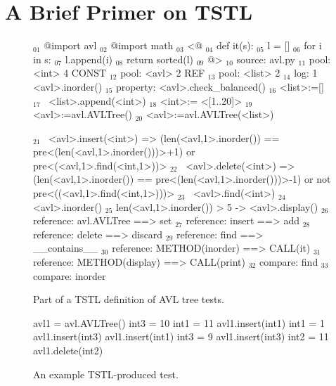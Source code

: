 \section{A Brief Primer on TSTL}

\begin{figure}
{\scriptsize
\begin{code}
$_{01}$ @import avl
$_{02}$ @import math
\vspace{0.1in}
$_{03}$ <@
$_{04}$ def it(s):
$_{05}$     l = []
$_{06}$     for i in s:
$_{07}$        l.append(i)
$_{08}$     return sorted(l)
$_{09}$ @>
\vspace{0.1in}
$_{10}$ source: avl.py
\vspace{0.1in}
$_{11}$ pool: <int> 4 CONST
$_{12}$ pool: <avl> 2 REF
$_{13}$ pool: <list> 2
\vspace{0.1in}
$_{14}$ log: 1 <avl>.inorder()
\vspace{0.1in}
$_{15}$ property: <avl>.check\_balanced()
\vspace{0.1in}
$_{16}$ <list>:=[]
$_{17}$ ~<list>.append(<int>) 
$_{18}$ <int>:= <[1..20]>
\vspace{0.1in}
$_{19}$ <avl>:=avl.AVLTree()
$_{20}$ <avl>:=avl.AVLTree(<list>)
\vspace{0.1in}

$_{21}$ ~<avl>.insert(<int>) => (len(<avl,1>.inorder()) == pre<(len(<avl,1>.inorder()))>+1) 
  or pre<(<avl,1>.find(<int,1>))>
$_{22}$ ~<avl>.delete(<int>) => (len(<avl,1>.inorder()) == pre<(len(<avl,1>.inorder()))>-1) 
  or not pre<((<avl,1>.find(<int,1>)))>
$_{23}$ ~<avl>.find(<int>)
$_{24}$ <avl>.inorder()
$_{25}$ len(<avl,1>.inorder()) > 5 -> <avl>.display()
\vspace{0.1in}
$_{26}$ reference: avl.AVLTree ==> set
$_{27}$ reference: insert ==> add
$_{28}$ reference: delete ==> discard
$_{29}$ reference: find ==> \_\_contains\_\_
$_{30}$ reference: METHOD(inorder) ==> CALL(it)
$_{31}$ reference: METHOD(display) ==> CALL(print)
\vspace{0.1in}
$_{32}$ compare: find
$_{33}$ compare: inorder
\end{code}
}
\caption{Part of a TSTL definition of AVL tree tests.}
\label{fig:example}
\end{figure}


\begin{figure}
{\scriptsize 
\begin{code}
avl1 = avl.AVLTree()  
int3 = 10  
int1 = 11  
avl1.insert(int1) 
int1 = 1  
avl1.insert(int3) 
avl1.insert(int1) 
int3 = 9  
avl1.insert(int3) 
int2 = 11  
avl1.delete(int2) 
\end{code}
}
\caption{An example TSTL-produced test.}
\label{fig:avlrun}
\end{figure}



